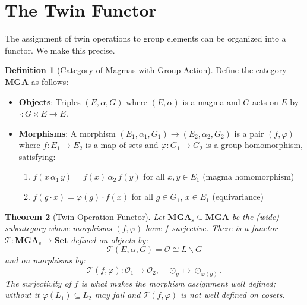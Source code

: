 \documentclass[11pt,a4paper,openany]{book}
\theoremstyle{plain}
\newtheorem{theorem}{Theorem}[chapter]
\theoremstyle{definition}
\newtheorem{definition}[theorem]{Definition}
\newcommand{\twing}[1]{\odot_{#1}}
\newcommand{\opspace}{\mathcal{O}}
\newcommand{\lingroup}{L}
\newcommand{\actspace}{E}
\newcommand{\groupG}{G}
\begin{document}
\section{The Twin Functor}

The assignment of twin operations to group elements can be organized into a functor. We make this precise.

\begin{definition}[Category of Magmas with Group Action]\label{def:cat-mga}
Define the category $\mathbf{MGA}$ as follows:
\begin{itemize}
    \item \textbf{Objects}: Triples $(\actspace, \alpha, \groupG)$ where $(\actspace, \alpha)$ is a magma and $\groupG$ acts on $\actspace$ by $\cdot : \groupG \times \actspace \to \actspace$.
    \item \textbf{Morphisms}: A morphism $(\actspace_1, \alpha_1, \groupG_1) \to (\actspace_2, \alpha_2, \groupG_2)$ is a pair $(f, \varphi)$ where $f : \actspace_1 \to \actspace_2$ is a map of sets and $\varphi : \groupG_1 \to \groupG_2$ is a group homomorphism, satisfying:
    \begin{enumerate}
        \item $f(x \,\alpha_1\, y) = f(x) \,\alpha_2\, f(y)$ for all $x, y \in \actspace_1$ \quad (magma homomorphism)
        \item $f(g \cdot x) = \varphi(g) \cdot f(x)$ for all $g \in \groupG_1$, $x \in \actspace_1$ \quad (equivariance)
    \end{enumerate}
\end{itemize}
\end{definition}

\begin{theorem}[Twin Operation Functor]\label{thm:twin-functor}
Let $\mathbf{MGA}_{\mathrm{s}} \subseteq \mathbf{MGA}$ be the (wide) subcategory whose morphisms $(f, \varphi)$ have $f$ surjective. There is a functor $\mathcal{T} : \mathbf{MGA}_{\mathrm{s}} \to \mathbf{Set}$ defined on objects by:
\[
\mathcal{T}(\actspace, \alpha, \groupG) = \opspace \cong \lingroup\backslash\groupG
\]
and on morphisms by:
\[
\mathcal{T}(f, \varphi) : \opspace_1 \to \opspace_2, \quad \twing{g} \mapsto \twing{\varphi(g)}.
\]
The surjectivity of $f$ is what makes the morphism assignment well defined; without it $\varphi(\lingroup_1)\subseteq\lingroup_2$ may fail and $\mathcal{T}(f,\varphi)$ is not well defined on cosets.
\end{theorem}
\end{document}
